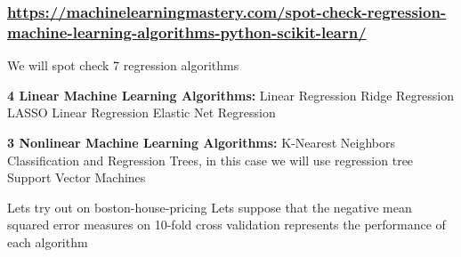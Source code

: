\documentclass[11pt]{article}
\begin{document}
\subsubsection{\url{https://machinelearningmastery.com/spot-check-regression-machine-learning-algorithms-python-scikit-learn/}}
\label{sec:orga7ce997}
We will spot check 7 regression algorithms

\textbf{4 Linear Machine Learning Algorithms:}
Linear Regression
Ridge Regression
LASSO Linear Regression
Elastic Net Regression

\textbf{3 Nonlinear Machine Learning Algorithms:}
K-Nearest Neighbors
Classification and Regression Trees, in this case we will use regression tree
Support Vector Machines

Lets try out on boston-house-pricing
Lets suppose that the negative mean squared error measures on 10-fold cross validation represents the performance of each algorithm
\end{document}
